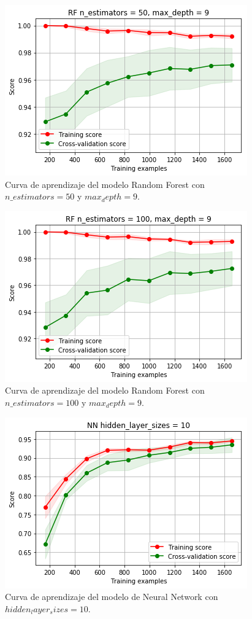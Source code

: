 \documentclass[11pt,a4paper]{article}
\begin{document}
\begin{figure}[H]
    \centering
    \includegraphics[scale=0.7]{img/lc-rf-n-50-d-9.png}
    \caption{Curva de aprendizaje del modelo Random Forest con $n\_estimators=50$ y $max_depth=9$.}
    \label{fig:lc-rf-n-50-d-9}
\end{figure}

\begin{figure}[H]
    \centering
    \includegraphics[scale=0.7]{img/lc-rf-n-100-d-9.png}
    \caption{Curva de aprendizaje del modelo Random Forest con $n\_estimators=100$ y $max_depth=9$.}
    \label{fig:lc-rf-n-100-d-9}
\end{figure}

\begin{figure}[H]
    \centering
    \includegraphics[scale=0.7]{img/lc-nn-10.png}
    \caption{Curva de aprendizaje del modelo de Neural Network con $hidden_layer_sizes=10$.}
    \label{fig:lc-nn-10}
\end{figure}
\end{document}
